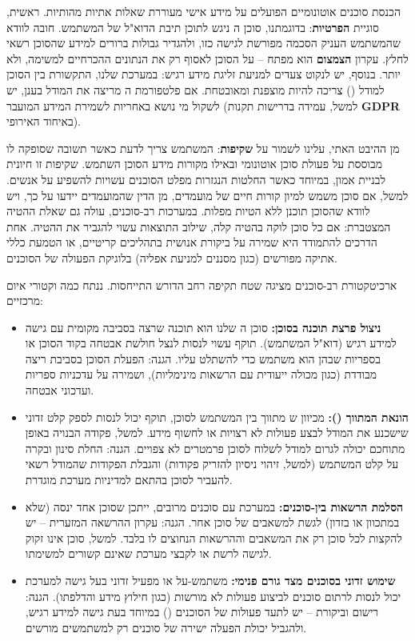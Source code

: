 

הכנסת סוכנים אוטונומיים הפועלים על מידע אישי מעוררת שאלות אתיות מהותיות. ראשית, סוגיית \textbf{הפרטיות}: בדוגמתנו, סוכן ה ניגש לתוכן תיבת הדוא"ל של המשתמש. חובה לוודא שהמשתמש העניק הסכמה מפורשת לגישה כזו, ולהגדיר גבולות ברורים למידע שהסוכן רשאי לחלץ. עקרון \textbf{הצמצום} הוא מפתח – על הסוכן לאסוף רק את הנתונים ההכרחיים למשימה, ולא יותר. בנוסף, יש לנקוט צעדים למניעת זליגת מידע רגיש: במערכת שלנו, התקשורת בין הסוכן למודל () צריכה להיות מוצפנת ומאובטחת. אם פלטפורמת ה מריצה את המודל בענן, יש לשקול מי נושא באחריות לשמירת המידע המועבר (למשל, עמידה בדרישות תקנות \textbf{GDPR} באיחוד האירופי).

מן ההיבט האתי, עלינו לשמור על \textbf{שקיפות}: המשתמש צריך לדעת כאשר תשובה שסופקה לו מבוססת על פעולת סוכן אוטונומי ובאילו מקורות מידע הסוכן השתמש. שקיפות זו חיונית לבניית אמון, במיוחד כאשר החלטות הנגזרות מפלט הסוכנים עשויות להשפיע על אנשים. למשל, אם סוכן  משמש למיון קורות חיים של מועמדים, מן הדין שהמועמדים יידעו על כך, ויש לוודא שהסוכן תוכנן ללא הטיות מפלות. במערכות רב-סוכנים, עולה גם שאלת ההטיה המצטברת: אם כל סוכן לוקה בהטיה קלה, שילוב התוצאות עשוי להגביר את ההטיה. אחת הדרכים להתמודד היא שמירה על ביקורת אנושית בתהליכים קריטיים, או הטמעת כללי אתיקה מפורשים (כגון מסננים למניעת אפליה) בלוגיקת הפעולה של הסוכנים.


ארכיטקטורת רב-סוכנים מציגה שטח תקיפה רחב הדורש התייחסות. ננתח כמה וקטורי איום מרכזיים:
\begin{itemize}
\item \textbf{ניצול פרצת תוכנה בסוכן:} סוכן ה שלנו הוא תוכנה שרצה בסביבה מקומית עם גישה למידע רגיש (דוא"ל המשתמש). תוקף עשוי לנסות לנצל חולשת אבטחה בקוד הסוכן או בספריות שבהן הוא משתמש כדי להשתלט עליו. הגנה: הפעלת הסוכן בסביבת ריצה מבודדת (כגון מכולה ייעודית עם הרשאות מינימליות), ושמירה על עדכניות ספריות ועדכוני אבטחה.
\item \textbf{הונאת המתווך ():} מכיוון ש מתווך בין המשתמש לסוכן, תוקף יכול לנסות לספק קלט זדוני שישכנע את המודל לבצע פעולות לא רצויות או לחשוף מידע. למשל, פקודה הבנויה באופן מתוחכם יכולה לגרום למודל לשלוח לסוכן פרמטרים לא צפויים. הגנה: החלת סינון ובקרה על קלט המשתמש (למשל, זיהוי ניסיון להזריק פקודות) והגבלת הפקודות שהמודל רשאי להעביר לסוכן בהתאם למדיניות מערכת מוגדרת.
\item \textbf{הסלמת הרשאות בין-סוכנים:} במערכת עם סוכנים מרובים, ייתכן שסוכן אחד ינסה (שלא במתכוון או בזדון) לגשת למשאבים של סוכן אחר. הגנה: עקרון ההרשאה המזערית – יש להקצות לכל סוכן רק את המשאבים וההרשאות הנחוצים לו בלבד. למשל, סוכן  אינו זקוק לגישה לרשת או לקבצי מערכת שאינם קשורים למשימתו.
\item \textbf{שימוש זדוני בסוכנים מצד גורם פנימי:} משתמש-על או מפעיל זדוני בעל גישה למערכת יכול לנסות לרתום סוכנים לביצוע פעולות לא מורשות (כגון חילוץ מידע והדלפתו). הגנה: רישום וביקורת – יש לתעד פעולות של הסוכנים () במיוחד בעת גישה למידע רגיש, ולהגביל יכולת הפעלה ישירה של סוכנים רק למשתמשים מורשים.
\end{itemize}

